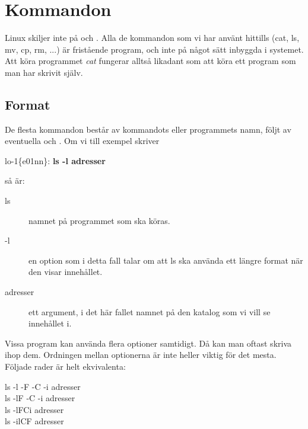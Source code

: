 \documentclass[a4paper,twocolumn]{book}
\begin{document}
\section{Kommandon}

Linux skiljer inte på  och
. Alla de kommandon som vi har
använt hittills (cat, ls, mv, cp, rm, ...) är fristående program, och
inte på något sätt inbyggda i systemet. Att köra programmet \emph{cat}
fungerar alltså likadant som att köra ett program som man har skrivit
själv.

\subsection{Format}

De flesta kommandon består av kommandots eller programmets namn, följt
av eventuella  och . Om vi till
exempel skriver
\begin{example}
  lo-1\{e01nn\}: \textbf{ls -l adresser}
\end{example}
så är:
\begin{description}
  \item[ls] namnet på programmet som ska köras.
  \item[-l] en option som i detta fall talar om att ls ska använda ett
    längre format när den visar innehållet.
  \item[adresser] ett argument, i det här fallet namnet på den katalog
    som vi vill se innehållet i.
\end{description}

Vissa program kan använda flera optioner samtidigt. Då kan man oftast
skriva ihop dem. Ordningen mellan optionerna är inte heller viktig för
det mesta. Följade rader är helt ekvivalenta:
\begin{ttquote}
  ls -l -F -C -i adresser \\
  ls -lF -C -i adresser \\
  ls -lFCi adresser \\
  ls -ilCF adresser
\end{ttquote}
\end{document}
